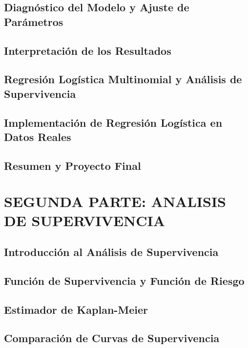 \documentclass{report}
\begin{document}
\chapter{Diagnóstico del Modelo y Ajuste de Parámetros}


\chapter{Interpretación de los Resultados}


\chapter{Regresión Logística Multinomial y Análisis de Supervivencia}


\chapter{Implementación de Regresión Logística en Datos Reales}


\chapter{Resumen y Proyecto Final}


\part{SEGUNDA PARTE: ANALISIS DE SUPERVIVENCIA}

\chapter{Introducción al Análisis de Supervivencia}


\chapter{Función de Supervivencia y Función de Riesgo}


\chapter{Estimador de Kaplan-Meier}


\chapter{Comparación de Curvas de Supervivencia}

\end{document}
